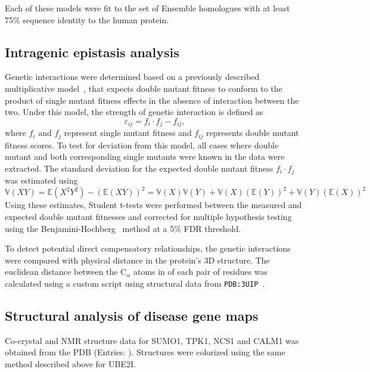 Each of these models were fit to the set of Ensemble homologues with at least 75\% sequence identity to the human protein. 

\subsection{Intragenic epistasis analysis} Genetic interactions were determined based on a previously described multiplicative model~\cite{phillips_language_1998,onge_systematic_2007}, that expects double mutant fitness to conform to the product of single mutant fitness effects in the absence of interaction between the two. Under this model, the strength of genetic interaction is defined as $$\varepsilon_{ij} = f_i \cdot f_j - f_{ij},$$ where $f_i$ and $f_j$ represent single mutant fitness and $f_{ij}$ represents double mutant fitness scores. To test for deviation from this model, all cases where double mutant and both corresponding single mutants were known in the data were extracted. The standard deviation for the expected double mutant fitness $f_i \cdot f_j$ was estimated using
$$ \mathbb{V}(XY) = \mathbb{E}(X^2Y^2)-(\mathbb{E}(XY))^2=\mathbb{V}(X)\mathbb{V}(Y) + \mathbb{V}(X)(\mathbb{E}(Y))^2+\mathbb{V}(Y)(\mathbb{E}(X))^2 $$ 
Using these estimates, Student t-tests were performed between the measured and expected double mutant fitnesses and corrected for multiple hypothesis testing using the  Benjamini-Hochberg~\cite{benjamini_controlling_1995} method at a 5\% FDR threshold.

To detect potential direct compensatory relationships, the genetic interactions were compared with physical distance in the protein's 3D structure. The euclidean distance between the C$_\alpha$ atoms in of each pair of residues was calculated using a custom script using structural data from \texttt{PDB:3UIP}~\cite{gareau_determinants_2012}.



\subsection{Structural analysis of disease gene maps}
Co-crystal and NMR structure data for SUMO1, TPK1, NCS1 and CALM1 was obtained from the PDB (Entries: ). Structures were colorized using the same method described above for UBE2I.

